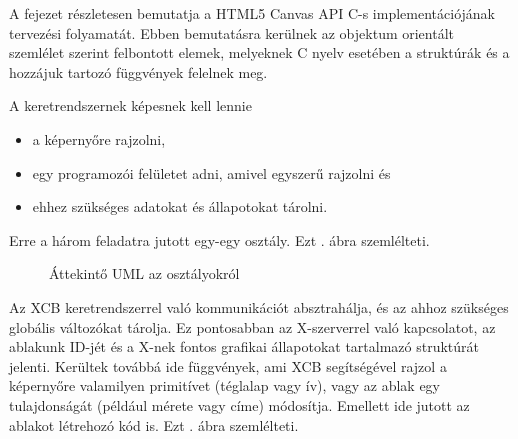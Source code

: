 
A fejezet részletesen bemutatja a HTML5 Canvas API C-s implementációjának tervezési folyamatát. Ebben bemutatásra kerülnek az objektum orientált szemlélet szerint felbontott elemek, melyeknek C nyelv esetében a struktúrák és a hozzájuk tartozó függvények felelnek meg.


A keretrendszernek képesnek kell lennie
\begin{itemize}
    \item a képernyőre rajzolni,
    \item egy programozói felületet adni, amivel egyszerű rajzolni és
    \item ehhez szükséges adatokat és állapotokat tárolni.
\end{itemize}
Erre a három feladatra jutott egy-egy osztály.
Ezt . ábra szemlélteti.

\begin{figure}[h!]
\centering
{}
\caption{Áttekintő UML az osztályokról}
\label{fig:overview-uml}
\end{figure}


Az XCB keretrendszerrel való kommunikációt absztrahálja, és az ahhoz szükséges globális változókat tárolja. Ez pontosabban az X-szerverrel való kapcsolatot, az ablakunk ID-jét és a X-nek fontos grafikai állapotokat tartalmazó struktúrát jelenti. Kerültek továbbá ide függvények, ami XCB segítségével rajzol a képernyőre valamilyen primitívet (téglalap vagy ív), vagy az ablak egy tulajdonságát (például mérete vagy címe) módosítja. Emellett ide jutott az ablakot létrehozó kód is.
Ezt . ábra szemlélteti.

